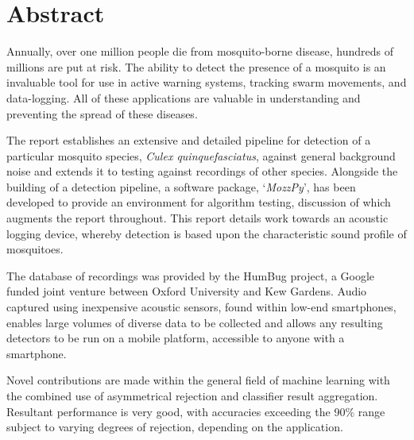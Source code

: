 \section*{Abstract}
   Annually, over one million people die from mosquito-borne disease, hundreds of millions are put at risk. The ability to detect the presence of a mosquito is an invaluable tool for use in active warning systems, tracking swarm movements, and data-logging. All of these applications are valuable in understanding and preventing the spread of these diseases. 
    
    The report establishes an extensive and detailed pipeline for detection of a particular mosquito species, \textit{Culex quinquefasciatus}, against general background noise and extends it to testing against recordings of other species. Alongside the building of a detection pipeline, a software package, `\textit{MozzPy}', has been developed to provide an environment for algorithm testing, discussion of which augments the report throughout. This report details work towards an acoustic logging device, whereby detection is based upon the characteristic sound profile of mosquitoes.
    
    The database of recordings was provided by the HumBug project, a Google funded joint venture between Oxford University and Kew Gardens. Audio captured using inexpensive acoustic sensors, found within low-end smartphones, enables large volumes of diverse data to be collected and allows any resulting detectors to be run on a mobile platform, accessible to anyone with a smartphone.
    
    Novel contributions are made within the general field of machine learning with the combined use of asymmetrical rejection and classifier result aggregation. Resultant performance is very good, with accuracies exceeding the 90\% range subject to varying degrees of rejection, depending on the application.